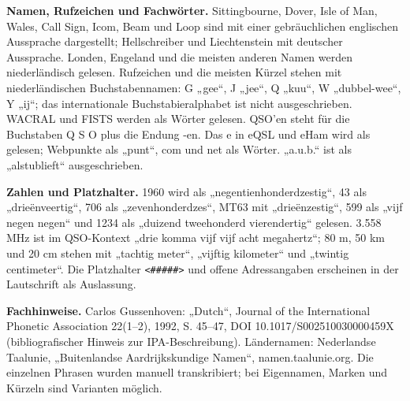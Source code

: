 \documentclass[a4paper,landscape,10pt]{article}
\newcommand{\ipa}[1]{{\ipafont[#1]}}
\begin{document}
\smallskip
\textbf{Namen, Rufzeichen und Fachwörter.} Sittingbourne, Dover, Isle of Man, Wales, Call Sign,
Icom, Beam und Loop sind mit einer gebräuchlichen englischen Aussprache dargestellt; Hellschreiber und
Liechtenstein mit deutscher Aussprache. Londen, Engeland und die meisten anderen Namen werden niederländisch gelesen.
Rufzeichen und die meisten Kürzel stehen mit niederländischen Buchstabennamen: G „gee“, J „jee“, Q „kuu“, W „dubbel-wee“, Y „ij“;
das internationale Buchstabieralphabet ist nicht ausgeschrieben. WACRAL und FISTS werden als Wörter gelesen.
QSO’en steht für die Buchstaben Q S O plus die Endung -en. Das e in eQSL und eHam wird als \ipa{iː} gelesen;
Webpunkte als „punt“, com und net als Wörter. „a.u.b.“ ist als „alstublieft“ ausgeschrieben.

\smallskip
\textbf{Zahlen und Platzhalter.} 1960 wird als „negentienhonderdzestig“, 43 als „drieënveertig“,
706 als „zevenhonderdzes“, MT63 mit „drieënzestig“, 599 als „vijf negen negen“ und
1234 als „duizend tweehonderd vierendertig“ gelesen. 3.558 MHz ist im QSO-Kontext „drie komma vijf vijf acht megahertz“;
80 m, 50 km und 20 cm stehen mit „tachtig meter“, „vijftig kilometer“ und „twintig centimeter“.
Die Platzhalter \texttt{<\#\#\#\#\#>} und offene Adressangaben erscheinen in der Lautschrift als Auslassung.

\smallskip
\textbf{Fachhinweise.} Carlos Gussenhoven: „Dutch“, Journal of the International Phonetic Association
22(1--2), 1992, S. 45--47, DOI 10.1017/S002510030000459X (bibliografischer Hinweis zur IPA-Beschreibung).
Ländernamen: Nederlandse Taalunie, „Buitenlandse Aardrijkskundige Namen“, namen.taalunie.org.
Die einzelnen Phrasen wurden manuell transkribiert; bei Eigennamen, Marken und Kürzeln sind Varianten möglich.
\end{document}

